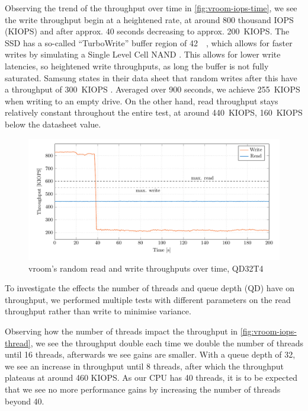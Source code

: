 Observing the trend of the throughput over time in \autoref{fig:vroom-iops-time}, we see the write throughput begin at a heightened rate, at around 800 thousand IOPS (KIOPS) and after approx. 40 seconds decreasing to approx. \qty{200}{KIOPS}. The SSD has a so-called ``TurboWrite'' buffer region of \qty{42}{\giga\byte}, which allows for faster writes by simulating a Single Level Cell NAND \cite{turbowrite}. This allows for lower write latencies, so heightened write throughputs, as long the buffer is not fully saturated. Samsung states in their data sheet that random writes after this have a throughput of \qty{300}{KIOPS} \cite{ssd-datasheet}. Averaged over 900 seconds, we achieve \qty{255}{KIOPS} when writing to an empty drive. On the other hand, read throughput stays relatively constant throughout the entire test, at around \qty{440}{KIOPS}, \qty{160}{KIOPS} below the datasheet value.

\begin{figure}[H]
  \centering
    \includegraphics[width=\textwidth]{figures/vroom-iops-time}
    \caption{vroom's random read and write throughputs over time, QD32T4}
    \label{fig:vroom-iops-time}
\end{figure}

To investigate the effects the number of threads and queue depth (QD) have on throughput, we performed multiple tests with different parameters on the read throughput rather than write to minimise variance.

Observing how the number of threads impact the throughput in \autoref{fig:vroom-iops-thread}, we see the throughput double each time we double the number of threads until 16 threads, afterwards we see gains are smaller. With a queue depth of 32, we see an increase in throughput until 8 threads, after which the throughput plateaus at around 460 KIOPS. As our CPU has 40 threads, it is to be expected that we see no more performance gains by increasing the number of threads beyond 40.

